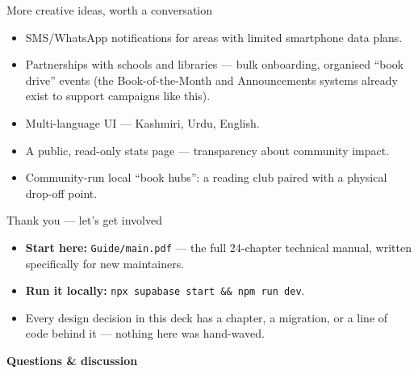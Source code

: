 \documentclass[aspectratio=169,11pt]{beamer}
\newcommand{\code}[1]{\textcolor{olkTealDark}{\texttt{#1}}}
\begin{document}
\begin{frame}{More creative ideas, worth a conversation}
  \begin{itemize}
    \item SMS/WhatsApp notifications for areas with limited smartphone data plans.
    \item Partnerships with schools and libraries --- bulk onboarding, organised ``book drive'' events (the Book-of-the-Month and Announcements systems already exist to support campaigns like this).
    \item Multi-language UI --- Kashmiri, Urdu, English.
    \item A public, read-only stats page --- transparency about community impact.
    \item Community-run local ``book hubs'': a reading club paired with a physical drop-off point.
  \end{itemize}
\end{frame}

\begin{frame}{Thank you --- let's get involved}
  \begin{itemize}
    \item \textbf{Start here:} \code{Guide/main.pdf} --- the full 24-chapter technical manual, written specifically for new maintainers.
    \item \textbf{Run it locally:} \code{npx supabase start \&\& npm run dev}.
    \item Every design decision in this deck has a chapter, a migration, or a line of code behind it --- nothing here was hand-waved.
  \end{itemize}
  \vfill
  \begin{center}
    \Large\textbf{Questions \& discussion}
  \end{center}
\end{frame}
\end{document}
